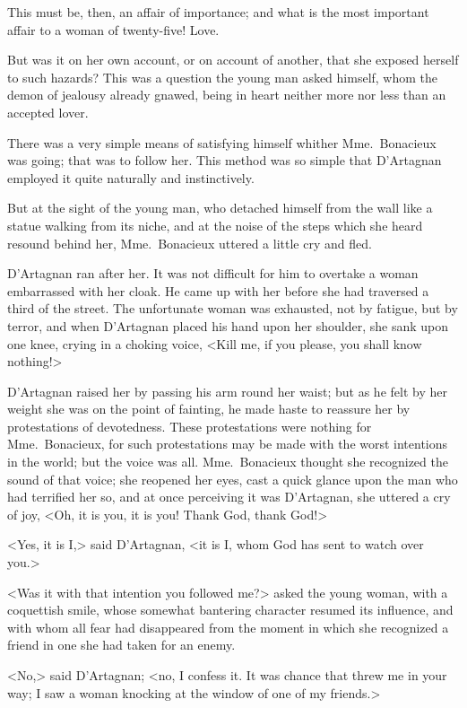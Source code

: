 This must be, then, an affair of importance; and what is the most important affair to a woman of twenty-five! Love. 

But was it on her own account, or on account of another, that she exposed herself to such hazards? This was a question the young man asked himself, whom the demon of jealousy already gnawed, being in heart neither more nor less than an accepted lover. 

There was a very simple means of satisfying himself whither Mme.~Bonacieux was going; that was to follow her. This method was so simple that D'Artagnan employed it quite naturally and instinctively. 

But at the sight of the young man, who detached himself from the wall like a statue walking from its niche, and at the noise of the steps which she heard resound behind her, Mme.~Bonacieux uttered a little cry and fled. 

D'Artagnan ran after her. It was not difficult for him to overtake a woman embarrassed with her cloak. He came up with her before she had traversed a third of the street. The unfortunate woman was exhausted, not by fatigue, but by terror, and when D'Artagnan placed his hand upon her shoulder, she sank upon one knee, crying in a choking voice, <Kill me, if you please, you shall know nothing!> 

D'Artagnan raised her by passing his arm round her waist; but as he felt by her weight she was on the point of fainting, he made haste to reassure her by protestations of devotedness. These protestations were nothing for Mme.~Bonacieux, for such protestations may be made with the worst intentions in the world; but the voice was all. Mme.~Bonacieux thought she recognized the sound of that voice; she reopened her eyes, cast a quick glance upon the man who had terrified her so, and at once perceiving it was D'Artagnan, she uttered a cry of joy, <Oh, it is you, it is you! Thank God, thank God!> 

<Yes, it is I,> said D'Artagnan, <it is I, whom God has sent to watch over you.> 

<Was it with that intention you followed me?> asked the young woman, with a coquettish smile, whose somewhat bantering character resumed its influence, and with whom all fear had disappeared from the moment in which she recognized a friend in one she had taken for an enemy. 

<No,> said D'Artagnan; <no, I confess it. It was chance that threw me in your way; I saw a woman knocking at the window of one of my friends.> 

